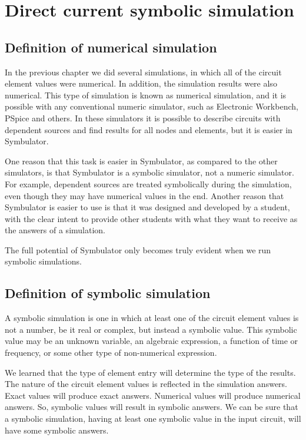 
\chapter{Direct current symbolic simulation}

\section{Definition of numerical simulation}

In the previous chapter we did several simulations, in which all of
the circuit element values were numerical. In addition, the
simulation results were also numerical. This type of simulation is
known as numerical simulation, and it is possible with any
conventional numeric simulator, such as Electronic Workbench, PSpice
and others. In these simulators it is possible to describe circuits
with dependent sources and find results for all nodes and elements,
but it is easier in Symbulator.

One reason that this task is easier in Symbulator, as compared to
the other simulators, is that Symbulator is a symbolic simulator,
not a numeric simulator. For example, dependent sources are treated
symbolically during the simulation, even though they may have
numerical values in the end. Another reason that Symbulator is
easier to use is that it was designed and developed by a student,
with the clear intent to provide other students with what they want
to receive as the answers of a simulation.

The full potential of Symbulator only becomes truly evident when we
run symbolic simulations.

\section{Definition of symbolic simulation}

A symbolic simulation is one in which at least one of the circuit
element values is not a number, be it real or complex, but instead a
symbolic value. This symbolic value may be an unknown variable, an
algebraic expression, a function of time or frequency, or some other
type of non-numerical expression.

We learned that the type of element entry will determine the type of
the results. The nature of the circuit element values is reflected
in the simulation answers. Exact values will produce exact answers.
Numerical values will produce numerical answers. So, symbolic values
will result in symbolic answers. We can be sure that a symbolic
simulation, having at least one symbolic value in the input circuit,
will have some symbolic answers.

